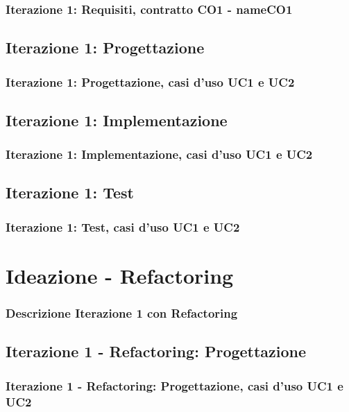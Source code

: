 \documentclass[t]{beamer} %
\begin{document}
\begin{frame} [allowframebreaks]
 \frametitle{Iterazione 1: Requisiti, contratto CO1 - nameCO1}
  \begin{table}[!htbp]
   \caption {Contratto CO1 - nameCO1}
    \label{table:1}
   \end{table}
\end{frame}

\subsection{Iterazione 1: Progettazione}
\begin{frame}
 \frametitle{Iterazione 1: Progettazione, casi d'uso UC1 e UC2}
\end{frame}

\subsection{Iterazione 1: Implementazione}
\begin{frame}
 \frametitle{Iterazione 1: Implementazione, casi d'uso UC1 e UC2}
\end{frame}

\subsection{Iterazione 1: Test}
\begin{frame}
 \frametitle{Iterazione 1: Test, casi d'uso UC1 e UC2}
\end{frame}

\section{Ideazione - Refactoring}
\begin{frame}
  \frametitle{Descrizione Iterazione 1 con Refactoring}
\end{frame}

\subsection{Iterazione 1 - Refactoring: Progettazione}
\begin{frame}
  \frametitle{Iterazione 1 - Refactoring: Progettazione, casi d'uso UC1 e UC2}
\end{frame}
\end{document}
